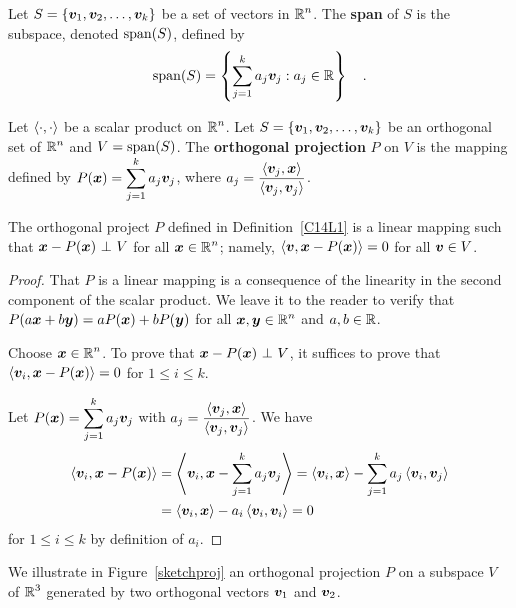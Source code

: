 \begin{defn}
Let $S = \{\bm{v}_1, \bm{v}_2, \ldots , \bm{v}_k\}$ be a set of
vectors in $\displaystyle \mathbb{R}^n$.  The {\bfseries span}
of $S$ is the subspace, denoted $\operatorname{span}(S)$, defined by
\[
  \operatorname{span}(S) = \left\{ \sum_{j=1}^k a_j \bm{v}_j : a_j \in \mathbb{R} \right\} \quad .
\]
\end{defn}

\begin{defn}
Let $\left\langle{\cdot} , {\cdot}\right\rangle$ be a scalar product on $\displaystyle \mathbb{R}^n$.  Let
$S = \{\bm{v}_1, \bm{v}_2, \ldots , \bm{v}_k\}$ be an orthogonal
set of $\displaystyle \mathbb{R}^n$ and $V = \operatorname{span}(S)$.
The
{\bfseries orthogonal projection}
$P$ on $V$ is the mapping
defined by $\displaystyle P(\bm{x}) = \sum_{j=1}^k a_j \bm{v}_j$,
where
$\displaystyle a_j = \frac{\left\langle{\bm{v}_j} , {\bm{x}}\right\rangle}
{\left\langle{\bm{v}_j} , {\bm{v}_j}\right\rangle}$.
\label{C14L1}
\end{defn}

\begin{prop}
The orthogonal project $P$ defined in Definition~\ref{C14L1} is
a linear mapping such that $\bm{x} - P(\bm{x}) \operatorname{\,\bot\,} V$ for all
$\displaystyle \bm{x} \in \mathbb{R}^n$; namely,
$\left\langle{\bm{v}} , {\bm{x} - P(\bm{x})}\right\rangle = 0$ for all $\bm{v} \in V$.
\end{prop}

\begin{proof}
That $P$ is a linear mapping is a consequence of the linearity in the
second component of the scalar product.  We leave it to the reader to
verify that $P(a\bm{x} + b\bm{y}) = a P(\bm{x}) + b P(\bm{y})$ for
all $\displaystyle \bm{x},\bm{y} \in \mathbb{R}^n$ and $a,b \in \mathbb{R}$.

Choose $\displaystyle \bm{x} \in \mathbb{R}^n$.  To prove that
$\bm{x} - P(\bm{x}) \operatorname{\,\bot\,} V$,
it suffices to prove that $\left\langle{\bm{v}_i} , {\bm{x} - P(\bm{x})}\right\rangle = 0$ for
$1 \leq i \leq k$.

Let $\displaystyle P(\bm{x}) = \sum_{j=1}^k a_j \bm{v}_j$ with
$\displaystyle a_j = \frac{\left\langle{\bm{v}_j} , {\bm{x}}\right\rangle}
{\left\langle{\bm{v}_j} , {\bm{v}_j}\right\rangle}$.  We have
\begin{align*}
\left\langle{\bm{v}_i} , {\bm{x} - P(\bm{x})}\right\rangle &=
\left\langle{\bm{v}_i} , {\bm{x} - \sum_{j=1}^k a_j \bm{v}_j}\right\rangle
= \left\langle{\bm{v}_i} , {\bm{x}}\right\rangle - \sum_{j=1}^k a_j \left\langle{\bm{v}_i} , {\bm{v}_j}\right\rangle  \\
& = \left\langle{\bm{v}_i} , {\bm{x}}\right\rangle - a_i \left\langle{\bm{v}_i} , {\bm{v}_i}\right\rangle = 0
\end{align*}
for $1 \leq i \leq k$ by definition of $a_i$.
\end{proof}

We illustrate in Figure~\ref{sketchproj} an orthogonal projection $P$ on a
subspace $V$ of $\displaystyle \mathbb{R}^3$ generated by two orthogonal vectors
$\bm{v}_1$ and $\bm{v}_2$.

